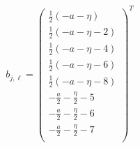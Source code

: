 \documentclass[11pt]{article}
\begin{document}
\begin{align*}
  b_{j,\ell} = 
  \left(
\begin{array}{c}
 \frac{1}{2} (-a-\eta ) \\
 \frac{1}{2} (-a-\eta -2) \\
 \frac{1}{2} (-a-\eta -4) \\
 \frac{1}{2} (-a-\eta -6) \\
 \frac{1}{2} (-a-\eta -8) \\
 -\frac{a}{2}-\frac{\eta }{2}-5 \\
 -\frac{a}{2}-\frac{\eta }{2}-6 \\
 -\frac{a}{2}-\frac{\eta }{2}-7 \\
\end{array}
\right)^T 
\end{align*}
\end{document}
